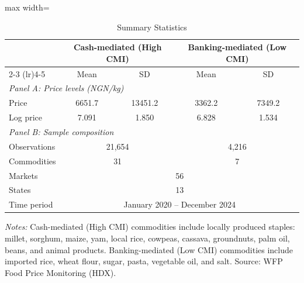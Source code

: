 \begin{table}[t]
\centering
\caption{Summary Statistics}
\label{tab:sumstats}
\begin{adjustbox}{max width=\textwidth}
\begin{tabular}{lcccc}
\toprule
 & \multicolumn{2}{c}{Cash-mediated (High CMI)} & \multicolumn{2}{c}{Banking-mediated (Low CMI)} \\
\cmidrule(lr){2-3} \cmidrule(lr){4-5}
 & Mean & SD & Mean & SD \\
\midrule
\multicolumn{5}{l}{\textit{Panel A: Price levels (NGN/kg)}} \\
Price & 6651.7 & 13451.2 & 3362.2 & 7349.2 \\
Log price & 7.091 & 1.850 & 6.828 & 1.534 \\
\midrule
\multicolumn{5}{l}{\textit{Panel B: Sample composition}} \\
Observations & \multicolumn{2}{c}{21,654} & \multicolumn{2}{c}{4,216} \\
Commodities & \multicolumn{2}{c}{31} & \multicolumn{2}{c}{7} \\
Markets & \multicolumn{4}{c}{56} \\
States & \multicolumn{4}{c}{13} \\
Time period & \multicolumn{4}{c}{January 2020 -- December 2024} \\
\bottomrule
\end{tabular}
\end{adjustbox}
\begin{tablenotes}[flushleft]
\small
\item \textit{Notes:} Cash-mediated (High CMI) commodities include locally produced staples: millet, sorghum, maize, yam, local rice, cowpeas, cassava, groundnuts, palm oil, beans, and animal products. Banking-mediated (Low CMI) commodities include imported rice, wheat flour, sugar, pasta, vegetable oil, and salt. Source: WFP Food Price Monitoring (HDX).
\end{tablenotes}
\end{table}

